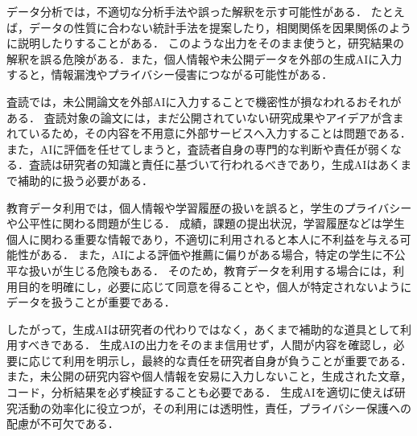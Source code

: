 \documentclass[titlepage,a4paper]{jsarticle}
\begin{document}
データ分析では，不適切な分析手法や誤った解釈を示す可能性がある．
たとえば，データの性質に合わない統計手法を提案したり，相関関係を因果関係のように説明したりすることがある．
このような出力をそのまま使うと，研究結果の解釈を誤る危険がある．また，個人情報や未公開データを外部の生成AIに入力すると，情報漏洩やプライバシー侵害につながる可能性がある．

査読では，未公開論文を外部AIに入力することで機密性が損なわれるおそれがある．
査読対象の論文には，まだ公開されていない研究成果やアイデアが含まれているため，その内容を不用意に外部サービスへ入力することは問題である．
また，AIに評価を任せてしまうと，査読者自身の専門的な判断や責任が弱くなる．査読は研究者の知識と責任に基づいて行われるべきであり，生成AIはあくまで補助的に扱う必要がある．

教育データ利用では，個人情報や学習履歴の扱いを誤ると，学生のプライバシーや公平性に関わる問題が生じる．
成績，課題の提出状況，学習履歴などは学生個人に関わる重要な情報であり，不適切に利用されると本人に不利益を与える可能性がある．
また，AIによる評価や推薦に偏りがある場合，特定の学生に不公平な扱いが生じる危険もある．
そのため，教育データを利用する場合には，利用目的を明確にし，必要に応じて同意を得ることや，個人が特定されないようにデータを扱うことが重要である．

したがって，生成AIは研究者の代わりではなく，あくまで補助的な道具として利用すべきである．
生成AIの出力をそのまま信用せず，人間が内容を確認し，必要に応じて利用を明示し，最終的な責任を研究者自身が負うことが重要である．
また，未公開の研究内容や個人情報を安易に入力しないこと，生成された文章，コード，分析結果を必ず検証することも必要である．
生成AIを適切に使えば研究活動の効率化に役立つが，その利用には透明性，責任，プライバシー保護への配慮が不可欠である．



\end{document}
